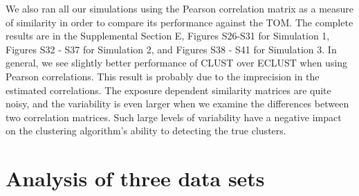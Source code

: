 We also ran all our simulations using the Pearson correlation matrix as a measure of similarity in order to compare its performance against the TOM. The complete results are in the Supplemental Section E, Figures S26-S31 for Simulation 1, Figures S32 - S37 for Simulation 2, and Figures S38 - S41 for Simulation 3. In general, we see slightly better performance of CLUST over ECLUST when using Pearson correlations.  This result is probably due to the imprecision in the estimated correlations.  The exposure dependent similarity matrices are quite noisy, and the variability is even larger when we examine the differences between two correlation matrices.  Such large levels of variability have a negative impact on the clustering algorithm's ability to detecting the true clusters.

\begin{comment}
\begin{figure}[h!]
	\centering
	\texttt{[image: figure6.eps]}
	\caption{Stability results from simulations 1, 2 and 3 for $SNR=1$, $\rho = 0.9$, and $\alpha_{j} \sim \tm{Unif}\left[1.9, 2.1\right]$. SEPARATE results are in pink, CLUST in green and ECLUST in blue.}
	\label{fig:sim-stability}
\end{figure}
\end{comment}



\section{Analysis of three data sets}

